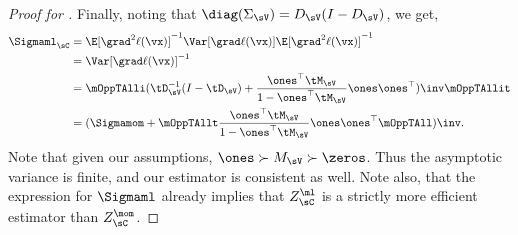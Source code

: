 \begin{proof}[Proof for ]
Finally, noting that $\diag(\Sigma_\sV) = D_\sV (I - D_\sV)$, we get,
\begin{align*}
    \Sigmaml_{\sC} 
      &= \E[\grad^2 \ell(\vx)]^{-1} \Var [\grad \ell(\vx)] \E[\grad^2 \ell(\vx)]^{-1} \\
      &= \Var[\grad \ell(\vx)]^{-1} \\
      &= 
        \mOppTAlli (\tD_{\sV}^{-1} (I - \tD_\sV) + \frac{\ones^\top \tM_\sV}{1 - \ones^\top \tM_\sV} \ones\ones^\top)\inv \mOppTAllit \\
      &= (\Sigmamom + \mOppTAllt \frac{\ones^\top \tM_\sV}{1 - \ones^\top \tM_\sV} \ones\ones^\top \mOppTAll)\inv.
\end{align*}
Note that given our assumptions, $\ones \succ M_\sV \succ \zeros$. 
Thus the asymptotic variance is finite, and our estimator is consistent
  as well. 
Note also, that the expression for $\Sigmaml$ already implies that
  $Z^\ml_\sC$ is a strictly more efficient estimator than $Z^\mom_\sC$.

\end{proof}

